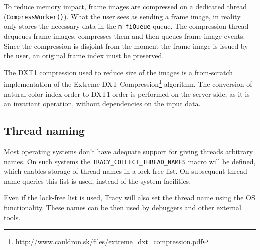 \documentclass[hidelinks,titlepage,a4paper]{article}
\begin{document}
To reduce memory impact, frame images are compressed on a dedicated thread (\texttt{CompressWorker()}). What the user sees as sending a frame image, in reality only stores the necessary data in the \texttt{m\_fiQueue} queue. The compression thread dequeues frame images, compresses them and then queues frame image events. Since the compression is disjoint from the moment the frame image is issued by the user, an original frame index must be preserved.

The DXT1 compression used to reduce size of the images is a from-scratch implementation of the Extreme DXT Compression\footnote{\url{http://www.cauldron.sk/files/extreme_dxt_compression.pdf}} algorithm. The conversion of natural color index order to DXT1 order is performed on the server side, as it is an invariant operation, without dependencies on the input data.

\subsection{Thread naming}

Most operating systems don't have adequate support for giving threads arbitrary names. On such systems the \texttt{TRACY\_COLLECT\_THREAD\_NAMES} macro will be defined, which enables storage of thread names in a lock-free list. On subsequent thread name queries this list is used, instead of the system facilities.

Even if the lock-free list is used, Tracy will also set the thread name using the OS functionality. These names can be then used by debuggers and other external tools.
\end{document}
